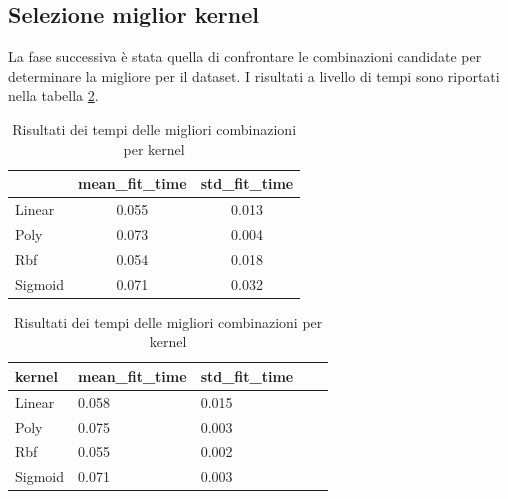 \subsection{Selezione miglior kernel}
La fase successiva è stata quella di confrontare le combinazioni candidate per
determinare la migliore per il dataset. I risultati a livello di tempi sono
riportati nella tabella \ref{tab:top_time_kernels_corr}.
\begin{table}[!ht]
    \centering
    \begin{tabular}{@{}lcc@{}}
        \toprule
        \rowcolor[HTML]{EFEFEF}
        \multicolumn{1}{c}{\cellcolor[HTML]{EFEFEF}\textbf{kernel}} & \textbf{mean\_fit\_time} & \textbf{std\_fit\_time} \\ \midrule
        Linear                                                      & 0.055                    & 0.013                   \\
        Poly                                                        & 0.073                    & 0.004                   \\
        Rbf                                                         & 0.054                    & 0.018                   \\
        Sigmoid                                                     & 0.071                    & 0.032                   \\ \bottomrule
    \end{tabular}
    \caption{Risultati dei tempi delle migliori combinazioni per kernel}
    \label{tab:top_time_kernels_corr}
\end{table}

    \begin{table}[!ht]
        \centering
        \begin{tabular}{|l|l|l|l|l|}
        \hline
            \textbf{kernel} & \textbf{mean\_fit\_time} & \textbf{std\_fit\_time} \\ \hline
            Linear & 0.058 & 0.015  \\ \hline
            Poly & 0.075 & 0.003  \\ \hline
            Rbf & 0.055 & 0.002  \\ \hline
            Sigmoid & 0.071 & 0.003  \\ \hline
        \end{tabular}
        \caption{Risultati dei tempi delle migliori combinazioni per kernel}
        \label{tab:top_time_kernels_corr}
    \end{table}

